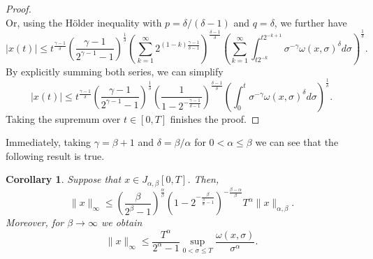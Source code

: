 \documentclass[12pt,a4paper]{article}
\newtheorem{cor}{Corollary}
\begin{document}
\begin{proof}
\begin{equation}
	\end{equation}
	Or, using the H\"older inequality with $p = \delta/(\delta-1)$ and $q = \delta$, we further have
	\begin{equation}
		|x(t)| \leq t^\frac{\gamma-1}{\delta} \left(\frac{\gamma-1}{2^{\gamma-1}-1}\right)^\frac{1}{\delta} \left(\sum_{k=1}^\infty 2^{(1-k) \frac{\gamma-1}{\delta-1}}\right)^\frac{\delta-1}{\delta} \left(\sum_{k=1}^\infty \int_{t2^{-k}}^{t2^{-k+1}} \sigma^{-\gamma} \omega(x, \sigma)^\delta d\sigma\right)^\frac{1}{\delta}.
	\end{equation}
	By explicitly summing both series, we can simplify
	\begin{equation}
		|x(t)| \leq t^\frac{\gamma-1}{\delta} \left(\frac{\gamma-1}{2^{\gamma-1}-1}\right)^\frac{1}{\delta} \left(\frac{1}{1-2^{-\frac{\gamma-1}{\delta-1}}}\right)^\frac{\delta-1}{\delta} \left(\int_{0}^{t} \sigma^{-\gamma} \omega(x, \sigma)^\delta d\sigma\right)^\frac{1}{\delta}.
	\end{equation}
	Taking the supremum over $t\in [0,T]$ finishes the proof.
\end{proof}
Immediately, taking $\gamma = \beta + 1$ and $\delta = \beta/\alpha$ for $0<\alpha \leq \beta$ we can see that the following result is true. 
\begin{cor}\label{cor:LInftyJBound}
	Suppose that $x \in J_{\alpha,\beta}[0,T]$. Then,
	\begin{equation}\label{eqn:LInftyJBound}
		\|x\|_\infty \leq \left(\frac{\beta}{2^{\beta}-1}\right)^\frac{\alpha}{\beta} \left(1-2^{-\frac{\beta}{\frac{\beta}{\alpha}-1}}\right)^{-\frac{\beta - \alpha}{\beta}}T^\alpha \|x\|_{\alpha,\beta}.
	\end{equation}
	Moreover, for $\beta\rightarrow\infty$ we obtain
	\begin{equation}\label{eqn:LInftyJBoundInfty}
		\|x\|_\infty \leq \frac{T^\alpha}{2^{\alpha}-1} \sup_{0<\sigma\leq T}\frac{\omega(x,\sigma)}{\sigma^\alpha}.
	\end{equation}
\end{cor}
\end{document}
